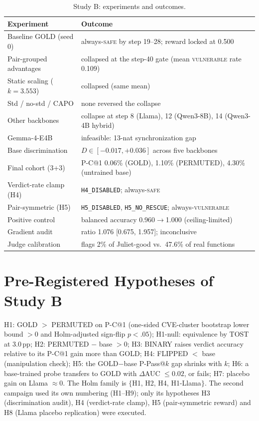 \documentclass[journal]{IEEEtran}
\makeatletter
\newcommand{\vuln}{\textsc{vulnerable}}
\newcommand{\safe}{\textsc{safe}}
\newcommand{\pc}{P-C@1}
\makeatother
\begin{document}
\begin{table}[!ht]
\centering\scriptsize\setlength{\tabcolsep}{3pt}
\caption{Study B: experiments and outcomes.}
\label{tab:sumB}
\begin{tabular}{p{2.1cm}p{6.0cm}}
\toprule
Experiment & Outcome\\
\midrule
Baseline GOLD (seed 0) & always-\safe{} by step 19--28; reward locked at 0.500\\
Pair-grouped advantages & collapsed at the step-40 gate (mean \vuln{} rate 0.109)\\
Static scaling ($k{=}3.553$) & collapsed (same mean)\\
Std / no-std / CAPO & none reversed the collapse\\
Other backbones & collapse at step 8 (Llama), 12 (Qwen3-8B), 14 (Qwen3-4B hybrid)\\
Gemma-4-E4B & infeasible: 13-nat synchronization gap\\
Base discrimination & $D\in[-0.017,+0.036]$ across five backbones\\
Final cohort (3+3) & \pc{} 0.06\% (GOLD), 1.10\% (PERMUTED), 4.30\% (untrained base)\\
Verdict-rate clamp (H4) & \texttt{H4\_DISABLED}; always-\safe{}\\
Pair-symmetric (H5) & \texttt{H5\_DISABLED}, \texttt{H5\_NO\_RESCUE}; always-\vuln{}\\
Positive control & balanced accuracy 0.960$\to$1.000 (ceiling-limited)\\
Gradient audit & ratio 1.076 [0.675, 1.957]; inconclusive\\
Judge calibration & flags 2\% of Juliet-good vs.\ 47.6\% of real functions\\
\bottomrule
\end{tabular}
\end{table}

\section{Pre-Registered Hypotheses of Study B}
H1: GOLD $>$ PERMUTED on \pc{} (one-sided CVE-cluster bootstrap lower bound $>0$ and Holm-adjusted sign-flip $p<.05$); H1-null: equivalence by TOST at 3.0\,pp; H2: PERMUTED $-$ base $>0$; H3: BINARY raises verdict accuracy relative to its \pc{} gain more than GOLD; H4: FLIPPED $<$ base (manipulation check); H5: the GOLD$-$base P-Pass@$k$ gap shrinks with $k$; H6: a base-trained probe transfers to GOLD with $\Delta$AUC $\le0.02$, or fails; H7: placebo gain on Llama $\approx0$. The Holm family is $\{$H1, H2, H4, H1-Llama$\}$. The second campaign used its own numbering (H1--H9); only its hypotheses H3 (discrimination audit), H4 (verdict-rate clamp), H5 (pair-symmetric reward) and H8 (Llama placebo replication) were executed.
\end{document}
